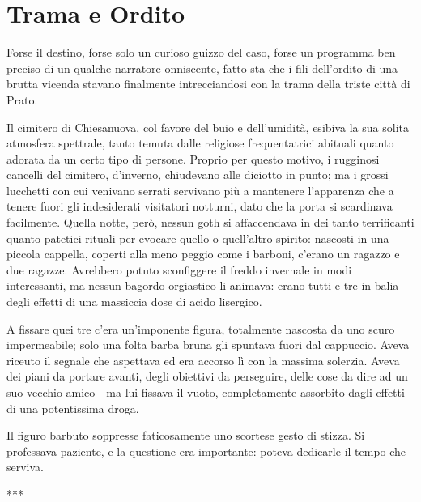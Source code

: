 \chapter{Trama e Ordito}


Forse il destino, forse solo un curioso guizzo del caso, forse un programma ben preciso di un qualche narratore onniscente, fatto sta che i fili dell'ordito di una brutta vicenda stavano finalmente intrecciandosi con la trama della triste città di Prato.

Il cimitero di Chiesanuova, col favore del buio e dell'umidità, esibiva la sua solita atmosfera spettrale, tanto temuta dalle religiose frequentatrici abituali quanto adorata da un certo tipo di persone. Proprio per questo motivo, i rugginosi cancelli del cimitero, d'inverno, chiudevano alle diciotto in punto; ma i grossi lucchetti con cui venivano serrati servivano più a mantenere l'apparenza che a tenere fuori gli indesiderati visitatori notturni, dato che la porta si scardinava facilmente. Quella notte, però, nessun goth si affaccendava in dei tanto terrificanti quanto patetici rituali per evocare quello o quell'altro spirito: nascosti in una piccola cappella, coperti alla meno peggio come i barboni, c'erano un ragazzo e due ragazze. Avrebbero potuto sconfiggere il freddo invernale in modi interessanti, ma nessun bagordo orgiastico li animava: erano tutti e tre in balia degli effetti di una massiccia dose di acido lisergico.

A fissare quei tre c'era un'imponente figura, totalmente nascosta da uno scuro impermeabile; solo una folta barba bruna gli spuntava fuori dal cappuccio. Aveva riceuto il segnale che aspettava ed era accorso lì con la massima solerzia. Aveva dei piani da portare avanti, degli obiettivi da perseguire, delle cose da dire ad un suo vecchio amico - ma lui fissava il vuoto, completamente assorbito dagli effetti di una potentissima droga.

Il figuro barbuto soppresse faticosamente uno scortese gesto di stizza. Si professava paziente, e la questione era importante: poteva dedicarle il tempo che serviva.

***
